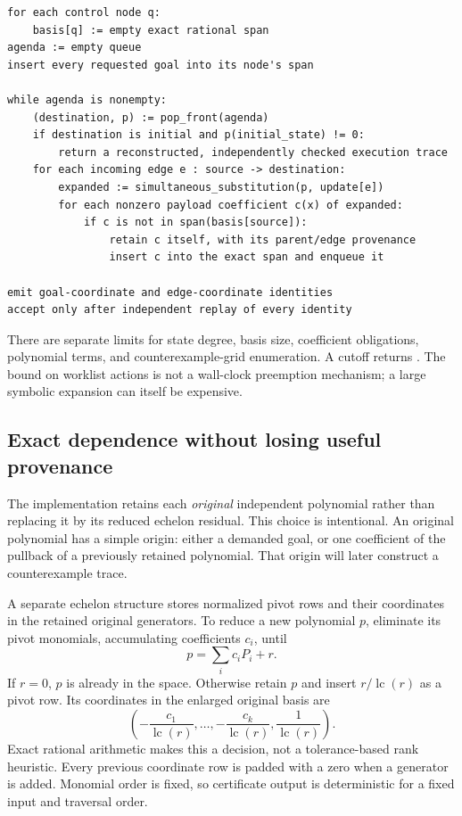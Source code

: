 \begin{lstlisting}
for each control node q:
    basis[q] := empty exact rational span
agenda := empty queue
insert every requested goal into its node's span

while agenda is nonempty:
    (destination, p) := pop_front(agenda)
    if destination is initial and p(initial_state) != 0:
        return a reconstructed, independently checked execution trace
    for each incoming edge e : source -> destination:
        expanded := simultaneous_substitution(p, update[e])
        for each nonzero payload coefficient c(x) of expanded:
            if c is not in span(basis[source]):
                retain c itself, with its parent/edge provenance
                insert c into the exact span and enqueue it

emit goal-coordinate and edge-coordinate identities
accept only after independent replay of every identity
\end{lstlisting}

There are separate limits for state degree, basis size, coefficient obligations,
polynomial terms, and counterexample-grid enumeration. A cutoff returns
\unknown{}. The bound on worklist actions is not a wall-clock preemption
mechanism; a large symbolic expansion can itself be expensive.

\subsection{Exact dependence without losing useful provenance}
The implementation retains each \emph{original} independent polynomial rather
than replacing it by its reduced echelon residual. This choice is intentional.
An original polynomial has a simple origin: either a demanded goal, or one
coefficient of the pullback of a previously retained polynomial. That origin
will later construct a counterexample trace.

A separate echelon structure stores normalized pivot rows and their coordinates
in the retained original generators. To reduce a new polynomial $p$, eliminate
its pivot monomials, accumulating coefficients $c_i$, until
\[
 p=\sum_i c_iP_i+r.
\]
If $r=0$, $p$ is already in the space. Otherwise retain $p$ and insert
$r/\operatorname{lc}(r)$ as a pivot row. Its coordinates in the enlarged
original basis are
\[
 \left(-\frac{c_1}{\operatorname{lc}(r)},\ldots,
       -\frac{c_k}{\operatorname{lc}(r)},
        \frac{1}{\operatorname{lc}(r)}\right).
\]
Exact rational arithmetic makes this a decision, not a tolerance-based rank
heuristic. Every previous coordinate row is padded with a zero when a generator
is added. Monomial order is fixed, so certificate output is deterministic for
a fixed input and traversal order.

